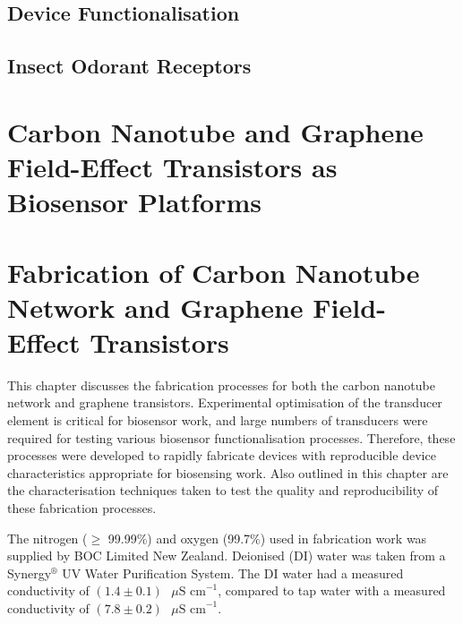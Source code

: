 \documentclass[
  a4paper,
]{scrbook}
\begin{document}
\hypertarget{device-functionalisation}{%
\section{Device Functionalisation}\label{device-functionalisation}}

\hypertarget{insect-odorant-receptors}{%
\section{Insect Odorant Receptors}\label{insect-odorant-receptors}}


\hypertarget{carbon-nanotube-and-graphene-field-effect-transistors-as-biosensor-platforms}{%
\chapter{Carbon Nanotube and Graphene Field-Effect Transistors as
Biosensor
Platforms}\label{carbon-nanotube-and-graphene-field-effect-transistors-as-biosensor-platforms}}


\hypertarget{sec-fabrication}{%
\chapter{Fabrication of Carbon Nanotube Network and Graphene
Field-Effect Transistors}\label{sec-fabrication}}

This chapter discusses the fabrication processes for both the carbon
nanotube network and graphene transistors. Experimental optimisation of
the transducer element is critical for biosensor work, and large numbers
of transducers were required for testing various biosensor
functionalisation processes. Therefore, these processes were developed
to rapidly fabricate devices with reproducible device characteristics
appropriate for biosensing work. Also outlined in this chapter are the
characterisation techniques taken to test the quality and
reproducibility of these fabrication processes.

The nitrogen (\(\geq\) 99.99\%) and oxygen (99.7\%) used in fabrication
work was supplied by BOC Limited New Zealand. Deionised (DI) water was
taken from a Synergy\(^\circledR\) UV Water Purification System. The DI
water had a measured conductivity of
\((1.4\pm0.1)\textrm{ } \mu \textrm{S cm}^{-1}\), compared to tap water
with a measured conductivity of
\((7.8\pm0.2)\textrm{ } \mu \textrm{S cm}^{-1}\).
\end{document}
